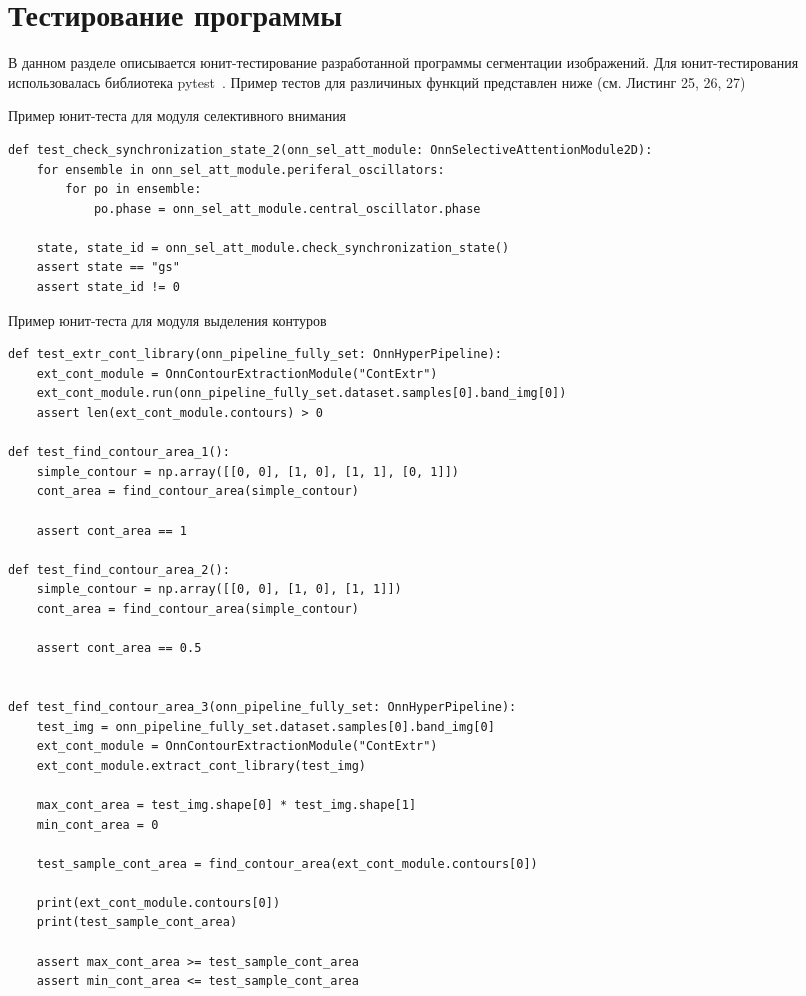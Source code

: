 \documentclass[14pt, russian]{scrartcl}
\begin{document}
\section{Тестирование программы}

В данном разделе описывается юнит-тестирование разработанной программы сегментации изображений. Для юнит-тестирования использовалась библиотека
pytest~\cite{3}. Пример тестов для различиных функций представлен ниже (см. Листинг 25, 26, 27)
\begin{listing}[H]
    \caption{Пример юнит-теста для модуля селективного внимания}
    \label{lst:contour_extr_sobel}
    \begin{verbatim}
def test_check_synchronization_state_2(onn_sel_att_module: OnnSelectiveAttentionModule2D):
    for ensemble in onn_sel_att_module.periferal_oscillators:
        for po in ensemble:
            po.phase = onn_sel_att_module.central_oscillator.phase

    state, state_id = onn_sel_att_module.check_synchronization_state()
    assert state == "gs"
    assert state_id != 0
    \end{verbatim}
\end{listing}

\begin{listing}[H]
    \caption{Пример юнит-теста для модуля выделения контуров}
    \label{lst:contour_extr_sobel}
    \begin{verbatim}
def test_extr_cont_library(onn_pipeline_fully_set: OnnHyperPipeline):
    ext_cont_module = OnnContourExtractionModule("ContExtr")
    ext_cont_module.run(onn_pipeline_fully_set.dataset.samples[0].band_img[0])
    assert len(ext_cont_module.contours) > 0

def test_find_contour_area_1():
    simple_contour = np.array([[0, 0], [1, 0], [1, 1], [0, 1]])
    cont_area = find_contour_area(simple_contour)

    assert cont_area == 1

def test_find_contour_area_2():
    simple_contour = np.array([[0, 0], [1, 0], [1, 1]])
    cont_area = find_contour_area(simple_contour)

    assert cont_area == 0.5


def test_find_contour_area_3(onn_pipeline_fully_set: OnnHyperPipeline):
    test_img = onn_pipeline_fully_set.dataset.samples[0].band_img[0]
    ext_cont_module = OnnContourExtractionModule("ContExtr")
    ext_cont_module.extract_cont_library(test_img)

    max_cont_area = test_img.shape[0] * test_img.shape[1]
    min_cont_area = 0

    test_sample_cont_area = find_contour_area(ext_cont_module.contours[0])

    print(ext_cont_module.contours[0])
    print(test_sample_cont_area)

    assert max_cont_area >= test_sample_cont_area
    assert min_cont_area <= test_sample_cont_area

    \end{verbatim}
\end{listing}
\end{document}
